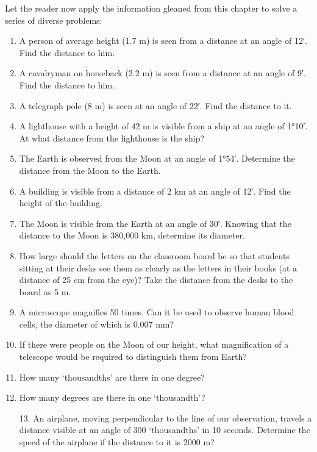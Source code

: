 Let the reader now apply the information gleaned from this chapter to solve a series of diverse problems:
\begin{enumerate}
\item A person of average height (1.7 m) is seen from a distance at an angle of \ang{;12}. Find the distance to him.

\item A cavalryman on horseback (2.2 m) is seen from a distance at an angle of \ang{;9}. Find the distance to him.

\item A telegraph pole (8 m) is seen at an angle of \ang{;22}. Find the distance to it.

\item A lighthouse with a height of 42 m is visible from a ship at an angle of \ang{1;10}. At what distance from the lighthouse is the ship?

\item The Earth is observed from the Moon at an angle of \ang{1;54}. Determine the distance from the Moon to the Earth.

\item A building is visible from a distance of 2 km at an angle of \ang{;12}. Find the height of the building.

\item The Moon is visible from the Earth at an angle of \ang{;30}. Knowing that the distance to the Moon is 380,000 km, determine its diameter.

\item How large should the letters on the classroom board be so that students sitting at their desks see them as clearly as the letters in their books (at a distance of 25 cm from the eye)? Take the distance from the desks to the board as 5 m.

\item A microscope magnifies 50 times. Can it be used to observe human blood cells, the diameter of which is 0.007 mm?

\item If there were people on the Moon of our height, what magnification of a telescope would be required to distinguish them from Earth?

\item How many `thousandths' are there in one degree?

\item How many degrees are there in one `thousandth'?

13. An airplane, moving perpendicular to the line of our observation, travels a distance visible at an angle of 300 `thousandths' in 10 seconds. Determine the speed of the airplane if the distance to it is 2000 m?

\end{enumerate}
